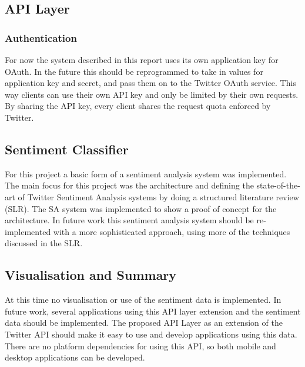 \subsection{API Layer}

\subsubsection{Authentication}
For now the system described in this report uses its own application key for OAuth. In the future this should be reprogrammed to take in values for application key and secret, and pass them on to the Twitter OAuth service. This way clients can use their own API key and only be limited by their own requests. By sharing the API key, every client shares the request quota enforced by Twitter.


\subsection{Sentiment Classifier}
For this project a basic form of a sentiment analysis system was implemented. The main focus for this project was the architecture and defining the state-of-the-art of Twitter Sentiment Analysis systems by doing a structured literature review (SLR). The SA system was implemented to show a proof of concept for the architecture. In future work this sentiment analysis system should be re-implemented with a more sophisticated approach, using more of the techniques discussed in the SLR. 

\subsection{Visualisation and Summary}

At this time no visualisation or use of the sentiment data is implemented. In future work, several applications using this API layer extension and the sentiment data should be implemented. The proposed API Layer as an extension of the Twitter API should make it easy to use and develop applications using this data. There are no platform dependencies for using this API, so both mobile and desktop applications can be developed. 